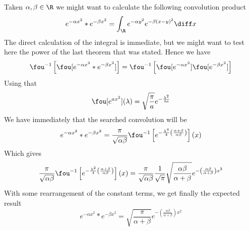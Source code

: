 \documentclass[../mmf.tex]{subfiles}
\begin{document}
\begin{eg}
	Taken $\alpha,\beta\in\R$ we might want to calculate the following convolution product
	\begin{equation*}
		e^{-\alpha x^2}*e^{-\beta x^2}=\int_{\R}^{}e^{-\alpha y^2}e^{-\beta(x-y)^2}\diff x
	\end{equation*}
	The direct calculation of the integral is immediate, but we might want to test here the power of the last theorem that was stated. Hence we have
	\begin{equation*}
		\fou^{-1}\left[ \fou[e^{-\alpha x^2}*e^{-\beta x^2}] \right]=\fou^{-1}\left[ \fou[e^{-\alpha x^2}]\fou[e^{-\beta x^2}] \right]
	\end{equation*}
	Using that
	\begin{equation*}
		\fou[e^{ax^2}](\lambda)=\sqrt{\frac{\pi}{a}}e^{-\frac{\lambda^2}{4a}}
	\end{equation*}
	We have immediately that the searched convolution will be
	\begin{equation*}
		e^{-\alpha x^2}*e^{-\beta x^2}=\frac{\pi}{\sqrt{\alpha\beta}}\fou^{-1}\left[ e^{-\frac{\lambda^4}{4}\left(\frac{\alpha+\beta}{\alpha\beta}\right)} \right](x)
	\end{equation*}
	Which gives
	\begin{equation*}
		\frac{\pi}{\sqrt{\alpha\beta}}\fou^{-1}\left[ e^{-\frac{\lambda^2}{4}\left( \frac{\alpha+\beta}{\alpha\beta} \right)} \right](x)=\frac{\pi}{\sqrt{\alpha\beta}}\frac{1}{\sqrt{\pi}}\sqrt{\frac{\alpha\beta}{\alpha+\beta}}e^{-\left( \frac{\alpha\beta}{\alpha+\beta} \right)x^2}
	\end{equation*}
	With some rearrangement of the constant terms, we get finally the expected result
	\begin{equation*}
		e^{-\alpha x^2}*e^{-\beta x^2}=\sqrt{\frac{\pi}{\alpha+\beta}}e^{-\left( \frac{\alpha\beta}{\alpha+\beta} \right)x^2}
	\end{equation*}
\end{eg}
\end{document}
